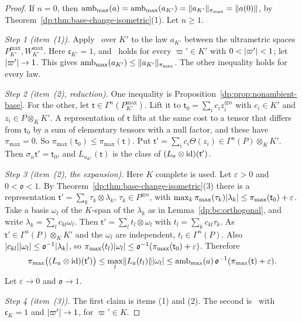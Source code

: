 \begin{proof}
If $n=0$, then $\operatorname{amb}_{\max}(a)=\operatorname{amb}_{\max}(a_{K'})=\lVert a_{K'}\rVert_{\pi_{\max}}=\lVert a(0)\rVert$, by Theorem~\ref{dp:thm:base-change-isometric}(1). Let $n\ge1$.

\emph{Step 1 (item~(1)).} Apply~\cite[(14.9)]{I} over $K'$ to the law $a_{K'}$ between the ultrametric spaces $P^{\max}_{K'},W^{\max}_{K'}$. Here $\mathfrak c_{K'}=1$, and~\cite[(14.9)]{I} holds for every $\varpi'\in K'$ with $0<\lvert \varpi'\rvert<1$; let $\lvert \varpi'\rvert\to1$. This gives $\operatorname{amb}_{\max}(a_{K'})\le\lVert a_{K'}\rVert_{\pi_{\max}}$. The other inequality holds for every law.

\emph{Step 2 (item~(2), reduction).} One inequality is Proposition~\ref{dp:prop:nonambient-base}. For the other, let $\mathsf t\in\Gamma^n(P^{\max}_{K'})$. Lift it to $\mathsf t_0=\sum_ic_iz_i^{\otimes n}$ with $c_i\in K'$ and $z_i\in P\otimes_KK'$. A representation of $\mathsf t$ lifts at the same cost to a tensor that differs from $\mathsf t_0$ by a sum of elementary tensors with a null factor, and these have $\pi_{\max}=0$. So $\pi_{\max}(\mathsf t_0)\le\pi_{\max}(\mathsf t)$. Put $\mathsf t'=\sum_ic_i\Theta(z_i)\in\Gamma^n(P)\otimes_KK'$. Then $\sigma_n\mathsf t'=\mathsf t_0$, and $L_{a_{K'}}(\mathsf t)$ is the class of $(L_a\otimes\mathrm{id})(\mathsf t')$.

\emph{Step 3 (item~(2), the expansion).} Here $K$ complete is used. Let $\varepsilon>0$ and $0<\mathfrak o<1$. By Theorem~\ref{dp:thm:base-change-isometric}(3) there is a representation $\mathsf t'=\sum_k\tau_k\otimes\lambda_k$, $\tau_k\in P^{\otimes n}$, with $\max_k\pi_{\max}(\tau_k)\lvert \lambda_k\rvert\le\pi_{\max}(\mathsf t_0)+\varepsilon$. Take a basis $\omega_l$ of the $K$-span of the $\lambda_k$ as in Lemma~\ref{dp:bc:orthogonal}, and write $\lambda_k=\sum_lc_{kl}\omega_l$. Then $\mathsf t'=\sum_lt_l\otimes\omega_l$ with $t_l=\sum_kc_{kl}\tau_k$. As $\mathsf t'\in\Gamma^n(P)\otimes_KK'$ and the $\omega_l$ are independent, $t_l\in\Gamma^n(P)$. Also $\lvert c_{kl}\rvert\lvert \omega_l\rvert\le\mathfrak o^{-1}\lvert \lambda_k\rvert$, so $\pi_{\max}(t_l)\lvert \omega_l\rvert\le\mathfrak o^{-1}(\pi_{\max}(\mathsf t_0)+\varepsilon)$. Therefore
\[
 \pi_{\max}\bigl((L_a\otimes\mathrm{id})(\mathsf t')\bigr)\le\max_l\lVert L_a(t_l)\rVert\lvert \omega_l\rvert\le\operatorname{amb}_{\max}(a)\,\mathfrak o^{-1}(\pi_{\max}(\mathsf t)+\varepsilon).
\]
Let $\varepsilon\to0$ and $\mathfrak o\to1$.

\emph{Step 4 (item~(3)).} The first claim is items (1) and (2). The second is~\cite[(14.9)]{I} with $\mathfrak c_K=1$ and $\lvert \varpi'\rvert\to1$, for $\varpi'\in K$.
\end{proof}

